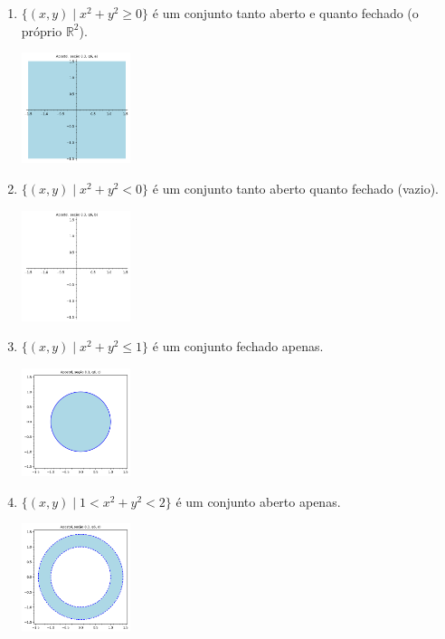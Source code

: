 \documentclass[../main.tex]{subfiles}
\begin{document}
		\begin{solucao}
			\begin{enumerate}[label=\alph*)]
				\item $\{(x,y) \mid x^2+y^2\geq0\}$ é um conjunto tanto aberto e quanto fechado (o próprio $\mathbb{R}^2$).
				\begin{center}
					\includegraphics[width=0.25\textwidth]{imagens/lista03/picture_lista03.02_q03_item01.png}
				\end{center}
				\item $\{(x,y) \mid x^2+y^2< 0\}$ é um conjunto tanto aberto quanto fechado (vazio).
				\begin{center}
					\includegraphics[width=0.25\textwidth]{imagens/lista03/picture_lista03.02_q03_item02.png}
				\end{center}
				\item $\{(x,y) \mid x^2+y^2\leq 1\}$ é um conjunto fechado apenas.
				\begin{center}
					\includegraphics[width=0.25\textwidth]{imagens/lista03/picture_lista03.02_q03_item03.png}
				\end{center}
				\item $\{(x,y) \mid 1<x^2+y^2<2\}$ é um conjunto aberto apenas.
				\begin{center}
					\includegraphics[width=0.25\textwidth]{imagens/lista03/picture_lista03.02_q03_item04.png}

\end{center}
\end{enumerate}
\end{solucao}
\end{document}
